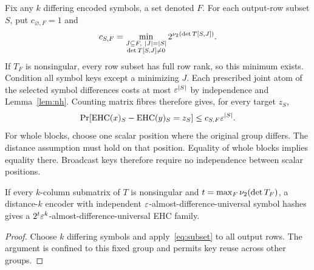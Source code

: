 Fix any $k$ differing encoded symbols, a set denoted $F$. For each output-row subset $S$, put $c_{\varnothing,F}=1$ and
\begin{equation}\label{eq:c}
 c_{S,F}=\min_{\substack{J\subseteq F,\ |J|=|S|\\\det T[S,J]\ne0}}
 2^{\nu_2(\det T[S,J])}.
\end{equation}
If $T_F$ is nonsingular, every row subset has full row rank, so this minimum exists. Condition all symbol keys except a minimizing $J$. Each prescribed joint atom of the selected symbol differences costs at most $\varepsilon^{|S|}$ by independence and Lemma~\ref{lem:nh}. Counting matrix fibres therefore gives, for every target $z_S$,
\begin{equation}\label{eq:subset}
 \mathop{\rm Pr}[\operatorname{EHC}(x)_S-\operatorname{EHC}(y)_S=z_S]
 \le c_{S,F}\varepsilon^{|S|}.
\end{equation}
For whole blocks, choose one scalar position where the original group differs. The distance assumption must hold on that position. Equality of whole blocks implies equality there. Broadcast keys therefore require no independence between scalar positions.

\begin{theorem}\label{thm:ehc}
If every $k$-column submatrix of $T$ is nonsingular and $t=\max_F\nu_2(\det T_F)$, a distance-$k$ encoder with independent $\varepsilon$-almost-difference-universal symbol hashes gives a $2^t\varepsilon^k$-almost-difference-universal EHC family.
\end{theorem}
\begin{proof}
Choose $k$ differing symbols and apply~\eqref{eq:subset} to all output rows. The argument is confined to this fixed group and permits key reuse across other groups.
\end{proof}

